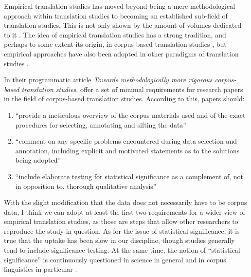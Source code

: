 \begin{refsection}

Empirical translation studies has moved beyond being a mere methodological approach within translation studies to becoming an established sub-field of translation studies. This is not only shown by the amount of volumes dedicated to it \parencites{hansen02}{caretal15}{ji16}{sutetal17}{jioak19}. The idea of empirical translation studies has a strong tradition, and perhaps to some extent its origin, in corpus-based translation studies \parencites{sutetal12}{jietal16}, but empirical approaches have also been adopted in other paradigms of translation studies \parencite{lavetal16}.

In their programmatic article \textit{Towards methodologically more rigorous corpus-based translation studies}, \textcite{sutetal12} offer a set of minimal requirements for research papers in the field of corpus-based translation studies. According to this, papers should:

\begin{enumerate}
  \item \enquote{provide a meticulous overview of the corpus materials used and of the exact procedures for selecting, annotating and sifting the data}
  \item \enquote{comment on any specific problems encountered during data selection and annotation, including explicit and motivated statements as to the solutions being adopted}
  \item \enquote{include elaborate testing for statistical significance as a complement of, not in opposition to, thorough qualitative analysis}
\end{enumerate}

\noindent With the slight modification that the data does not necessarily have to be corpus data, I think we can adopt at least the first two requirements for a wider view of empirical translation studies, as those are steps that allow other researchers to reproduce the study in question. As for the issue of statistical significance, it is true that the uptake has been slow in our discipline, though studies generally tend to include significance testing. At the same time, the notion of \enquote{statistical significance} is continuously questioned in science in general \parencites[see, e.g.,][]{mcsetal19} and in corpus linguistics in particular \parencite{koplenig19}.


\end{refsection}
